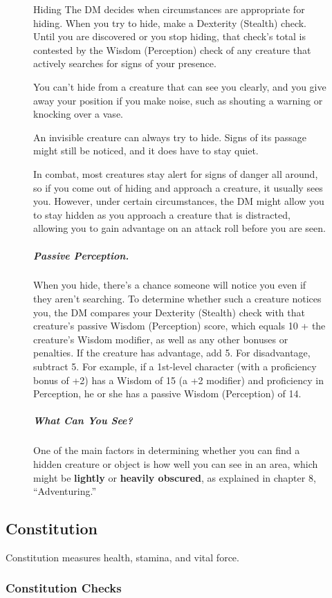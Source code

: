 \begin{figure}[htb]
    \begin{DndSidebar}{Hiding}
The DM decides when circumstances are appropriate for hiding. When you try to hide, make a Dexterity (Stealth) check. Until you are discovered or you stop hiding, that check's total is contested by the Wisdom (Perception) check of any creature that actively searches for signs of your presence.

You can't hide from a creature that can see you clearly, and you give away your position if you make noise, such as shouting a warning or knocking over a vase.

An invisible creature can always try to hide. Signs of its passage might still be noticed, and it does have to stay quiet.

In combat, most creatures stay alert for signs of danger all around, so if you come out of hiding and approach a creature, it usually sees you. However, under certain circumstances, the DM might allow you to stay hidden as you approach a creature that is distracted, allowing you to gain advantage on an attack roll before you are seen.

\subparagraph*{Passive Perception.} When you hide, there's a chance someone will notice you even if they aren't searching. To determine whether such a creature notices you, the DM compares your Dexterity (Stealth) check with that creature's passive Wisdom (Perception) score, which equals 10 + the creature's Wisdom modifier, as well as any other bonuses or penalties. If the creature has advantage, add 5. For disadvantage, subtract 5. For example, if a 1st-level character (with a proficiency bonus of +2) has a Wisdom of 15 (a +2 modifier) and proficiency in Perception, he or she has a passive Wisdom (Perception) of 14.

\subparagraph*{What Can You See?} One of the main factors in determining whether you can find a hidden creature or object is how well you can see in an area, which might be \textbf{lightly} or \textbf{heavily obscured}, as explained in chapter 8, “Adventuring.”
\end{DndSidebar}
\end{figure}
\subsection{Constitution}

Constitution measures health, stamina, and vital force.

\subsubsection{Constitution Checks}

